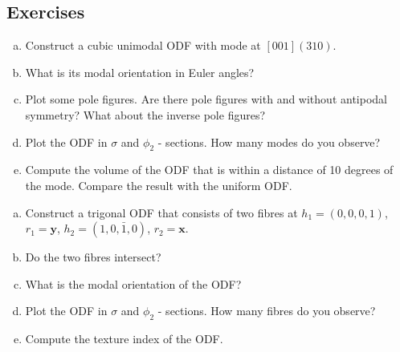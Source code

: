 \subsection*{Exercises}

\begin{frame}

  \begin{Exercise}
    \begin{enumerate}[a)]
      \item Construct a cubic unimodal ODF with mode at $[0 0 1](3 1 0)$.
      \item What is its modal orientation in Euler angles?
      \item Plot some pole figures. Are there pole figures with and without
        antipodal symmetry? What about the inverse pole figures?
      \item Plot the ODF in $\sigma$ and $\phi_{2}$ - sections. How many modes
        do you observe?
      \item Compute the volume of the ODF that is within a distance of 10
        degrees of the mode. Compare the result with the uniform ODF.
    \end{enumerate}
  \end{Exercise}

  \begin{Exercise}
    \begin{enumerate}[a)]
    \item Construct a trigonal ODF that consists of two fibres at
      $h_1 = (0,0,0,1)$, $r_{1} = \mathbf{y}$, $h_2 = (1,0,\bar 1,0)$, $r_{2} = \mathbf{x}$.
    \item Do the two fibres intersect?
    \item What is the modal orientation of the ODF?
    \item Plot the ODF in $\sigma$ and $\phi_{2}$ - sections. How many
      fibres do you observe?
    \item Compute the texture index of the ODF.
    \end{enumerate}
  \end{Exercise}

\end{frame}


